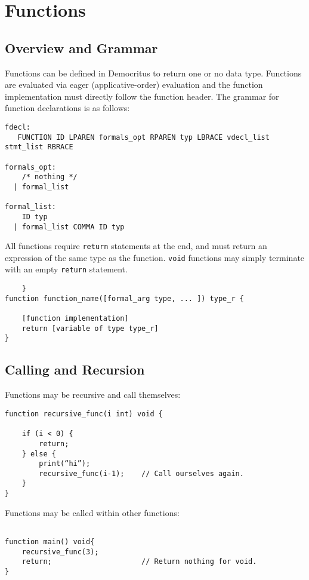 \section{Functions}
    \subsection{Overview and Grammar}
        Functions can be defined in Democritus to return one or no data type.  Functions are evaluated via eager (applicative-order) evaluation and the function implementation must directly follow the function header. The grammar for function declarations is as follows: 

        \begin{verbatim}
fdecl:
   FUNCTION ID LPAREN formals_opt RPAREN typ LBRACE vdecl_list stmt_list RBRACE 

formals_opt:
    /* nothing */
  | formal_list  

formal_list:
    ID typ                
  | formal_list COMMA ID typ 
        \end{verbatim}

        \noindent All functions require \texttt{return} statements at the end, and must return an expression of the same type as the function. \texttt{void} functions may simply terminate with an empty \texttt{return} statement. 
    

        \begin{lstlisting}
    }
function function_name([formal_arg type, ... ]) type_r {
    
    [function implementation]
    return [variable of type type_r]
}
        \end{lstlisting}


    \subsection{Calling and Recursion}

        Functions may be recursive and call themselves:

        \begin{lstlisting}
function recursive_func(i int) void {

    if (i < 0) {
        return;
    } else {
        print(“hi”);
        recursive_func(i-1);    // Call ourselves again.
    }
}
        \end{lstlisting}


        \noindent Functions may be called within other functions:
        \begin{lstlisting}

function main() void{
    recursive_func(3);
    return;                     // Return nothing for void.
}
        \end{lstlisting}

